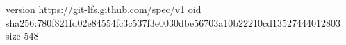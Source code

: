 version https://git-lfs.github.com/spec/v1
oid sha256:780f821fd02e84554fc3c537f3e0030dbe56703a10b22210cd13527444012803
size 548
